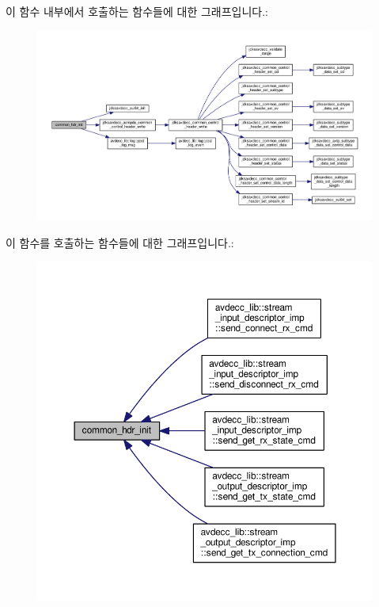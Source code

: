 이 함수 내부에서 호출하는 함수들에 대한 그래프입니다.\+:
\nopagebreak
\begin{figure}[H]
\begin{center}
\leavevmode
\includegraphics[width=350pt]{classavdecc__lib_1_1acmp__controller__state__machine_ae93a117baf9620a7311f950271610506_cgraph}
\end{center}
\end{figure}




이 함수를 호출하는 함수들에 대한 그래프입니다.\+:
\nopagebreak
\begin{figure}[H]
\begin{center}
\leavevmode
\includegraphics[width=350pt]{classavdecc__lib_1_1acmp__controller__state__machine_ae93a117baf9620a7311f950271610506_icgraph}
\end{center}
\end{figure}


